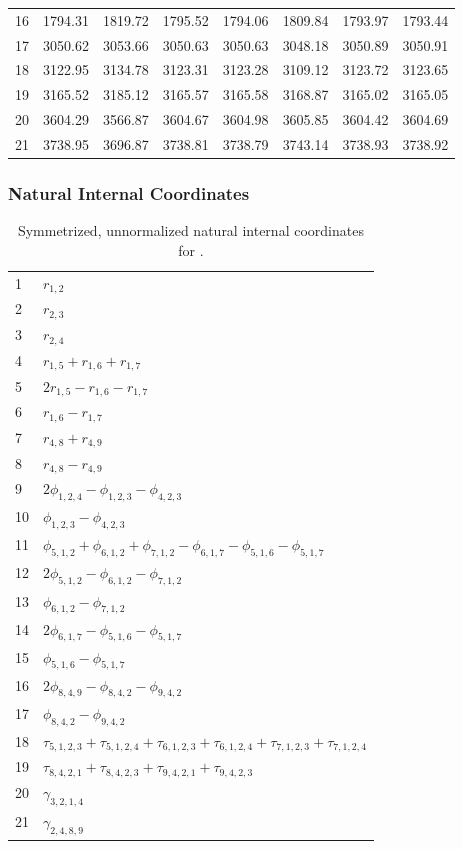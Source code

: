 \documentclass[10pt,oneside]{article}
\begin{document}
\begin{table}[h!]
\begin{tabular}{cccccccc}
16 &   1794.31 & 1819.72 & 1795.52 & 1794.06 &      1809.84 & 1793.97 & 1793.44 \\
17 &   3050.62 & 3053.66 & 3050.63 & 3050.63 &      3048.18 & 3050.89 & 3050.91 \\
18 &   3122.95 & 3134.78 & 3123.31 & 3123.28 &      3109.12 & 3123.72 & 3123.65 \\
19 &   3165.52 & 3185.12 & 3165.57 & 3165.58 &      3168.87 & 3165.02 & 3165.05 \\
20 &   3604.29 & 3566.87 & 3604.67 & 3604.98 &      3605.85 & 3604.42 & 3604.69 \\
21 &   3738.95 & 3696.87 & 3738.81 & 3738.79 &      3743.14 & 3738.93 & 3738.92 \\
\bottomrule
\end{tabular}
\end{table}

\clearpage

\subsubsection*{Natural Internal Coordinates}
\begin{table}[h!]
\centering
\caption{Symmetrized, unnormalized natural internal coordinates for .}
\small
\begin{tabular}{ll}
  1   & $r_{1,2}$ \\
  2   & $r_{2,3}$ \\
  3   & $r_{2,4}$ \\
  4   & $r_{1,5} + r_{1,6} + r_{1,7}$ \\
  5   & $2r_{1,5} - r_{1,6} - r_{1,7}$ \\
  6   & $r_{1,6} - r_{1,7}$ \\
  7   & $r_{4,8} + r_{4,9}$ \\
  8   & $r_{4,8} - r_{4,9}$ \\
  9   & $2\phi_{1,2,4} - \phi_{1,2,3} - \phi_{4,2,3}$ \\
  10  & $\phi_{1,2,3} - \phi_{4,2,3}$ \\
  11  & $\phi_{5,1,2} + \phi_{6,1,2} + \phi_{7,1,2} - \phi_{6,1,7} - \phi_{5,1,6} - \phi_{5,1,7}$ \\
  12  & $2\phi_{5,1,2} - \phi_{6,1,2} - \phi_{7,1,2}$ \\
  13  & $\phi_{6,1,2} - \phi_{7,1,2}$ \\
  14  & $2\phi_{6,1,7} - \phi_{5,1,6} - \phi_{5,1,7}$ \\
  15  & $\phi_{5,1,6} - \phi_{5,1,7}$ \\
  16  & $2\phi_{8,4,9} - \phi_{8,4,2} - \phi_{9,4,2}$ \\
  17  & $\phi_{8,4,2} - \phi_{9,4,2}$ \\
  18  & $\tau_{5,1,2,3} + \tau_{5,1,2,4} + \tau_{6,1,2,3} + \tau_{6,1,2,4} + \tau_{7,1,2,3} + \tau_{7,1,2,4}$ \\
  19  & $\tau_{8,4,2,1} + \tau_{8,4,2,3} + \tau_{9,4,2,1} + \tau_{9,4,2,3}$ \\
  20  & $\gamma_{3,2,1,4}$ \\
  21  & $\gamma_{2,4,8,9}$ \\
\end{tabular}
\end{table}
\end{document}
